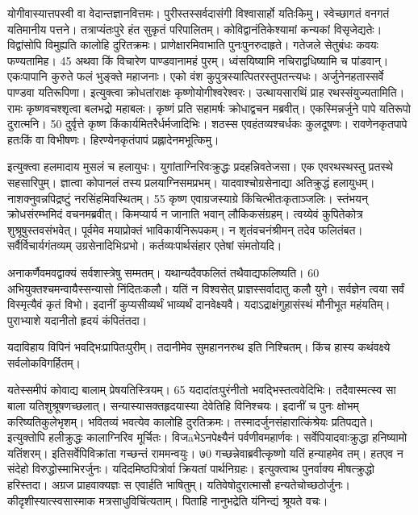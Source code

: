 योगीवास्यात्तपस्वी वा वेदान्तज्ञानवित्तमः।
 पुरीस्तस्सर्वदासंगी विश्वासार्हो यतिःकिमु।
 स्वेच्छागतं वनगतं यतिमानीय पत्तने।
 तत्राप्यंतःपुरे हंत सुकृतं परिपालितम्।
 कोविद्वानंतिकेश्यामां कन्यकां विसृजेद्यतेः।
 विद्वांसोपि विमुह्यति कालोहि दुरितक्रमः।
 प्राणेक्षारमिवाभाति पुनःपुनरुदाहृते।
 गतेजले सेतुबंधः कवयः फण्यतामिह।
 45 अथवा किं विचारेण पाण्डवानामहं पुरम्।
 ध्वंसयिष्यामि नचिराद्वधिष्यामि च पांडवान्।
 एकःपापानि कुरुते फलं भुङ्क्ते महाजनाः।
 एको वंश कुपुत्रस्यात्पितरस्तुपतन्त्यधः।
 अर्जुनेनहतास्सर्वे पाण्डवा यतिरूपिणा।
 इत्युक्त्वा क्रोधतांराक्षः कृष्णोयोगीश्वरेश्वरः।
 उत्थायसारथिं प्राह रथस्संयुज्यतामिति।
 रामः कृष्णवचश्शृत्वा बलभद्रो महाबलः।
 कृष्णं प्रति सहामर्षः क्रोधाद्वचन मब्रवीत्।
 एकस्मिन्नर्जुने पापे यतिरूपो दुरात्मनि।
 50 दुर्वृत्ते कृष्ण किंकार्यमितरैर्धर्मजादिभिः।
 शठस्स एवहंतव्यश्चर्धकः कुलदूषणः।
 रावणेनकृतपापे हतःकिं वा विभीषणः।
 हिरण्येनकृतंपापं प्रह्लादेनमभूत्किमु।
 
इत्युक्त्वा हलमादाय मुसलं च हलायुधः।
 युगांताग्निरिवःक्रुद्धः प्रदहन्निवतेजसा।
 एक एवरथस्थस्तु प्रतस्थे सहसारिपुम्।
 ज्ञात्वा कोपानलं तस्य प्रलयाग्निसमप्रभम्।
 यादवाश्चोग्रसेनाद्या अतिक्रुद्धं हलायुधम्।
 नाशक्नुवन्नपिद्रष्टुं नरसिंहमिवस्थितम्।
 55 कृष्ण एवाग्रजस्याग्रे किंचित्भीतःकृताञ्जलिः।
 स्तंभयन् क्रोधसंरम्भमिदं वचनमब्रवीत्।
 किमप्यार्य न जानाति भवान् लौकिकसंग्रहम्।
 त्वय्येवं कुपितेकोत्र शुश्रूषुस्तवसंभवेत्।
 पूर्वमेव मयाप्रोक्तं भाविकार्यनिरूपकम्।
 न शृतंवचनंश्रीमन् तदेव फलितंबत।
 सर्वैर्विचार्यगंतव्यम् उग्रसेनादिभिःप्रभो।
 कर्तव्यःपार्थसंहार एतेषां संमतोयदि।
 
अनाकर्णैवमवद्वाक्यं सर्वशास्त्रेषु सम्मतम्।
 यथान्यदैवफलितं तथैवाद्यफलिष्यति।
 60 अभियुक्तश्चमन्वायैस्सन्यासो निंदितःकलौ।
 यतिं न विश्वसेत् प्राज्ञस्सर्वादातु कलौ युगे।
 सर्वज्ञेन त्वया सर्वं विस्मृत्यैवं कृतं विभो।
 इदानीं कुप्यसीव्यर्थं भाव्यर्थं दानवेक्ष्यवै।
 यदाऽद्राक्षंगुहासंस्थं मौनीभूत महंयतिम्।
 पुराभ्याशे यदानीतो हृदयं कंपितंतदा।
 
यदाविहाय विपिनं भवद्भिःप्रापितःपुरीम्।
 तदानीमेव सुमहाननरुथ इति निश्चितम्।
 किंच हास्य कथंवक्ष्ये सर्वलोकविगर्हितम्।
 
यतेस्समीपं कोवाद्य बालाम् प्रेषयतिस्त्रियम्।
65 यदादांतःपुरंनीतो भवद्भिस्तत्ववेदिभिः।
 तदैवास्मत्स्व सा बाला यतिशुश्रूषणच्छलात्।
 सन्यास्यासक्तहृदयास्या देवेतिहि विनिश्चयः।
 इदानीं च पुनः क्षोभम् करिष्यतिकुलेभृशम्।
 भवितव्यं भवत्येव कालोहि दुरतिक्रमः।
 तस्मादर्जुनसंहारात्किंश्रेयः प्रतिपद्यते।
 इत्युक्तोपि हलीक्रुद्धः कालाग्निरिव मूर्चितः।
 विजāभेऽनपेक्ष्यैनं पर्वणीवमहार्णवः।
 सर्वेपियादवाःक्रुद्धा हनिष्यामो यतिंशरम्।
 इतिसर्वेपिविक्रांता गच्छन्तं राममन्वयुः।
 ७0 गच्छन्नेवाब्रवीत्कृष्णो यतिं हन्याहमेव तम्।
 हतएव न संदेहो विरुद्धोस्माभिरर्जुनः।
 यदिदमिष्ठपित्रोर्वा क्रियतां पार्थनिग्रहः।
 इत्युक्त्वाथ पुनर्वाक्य मीषत्क्रुद्धो हरिस्तदा।
 अग्रज प्राहवाक्यज्ञः स एवार्हति भाषितुम्।
 यतिवेषोदुरात्मासौ हन्यतेचोच्छठोर्जुनः।
 कीदृशीस्यात्स्वसास्माक मत्रसाधुविचिंत्यताम्।
 पिताहि नानुभद्रेति यंनिन्द्यं श्रूयते वचः।
 
